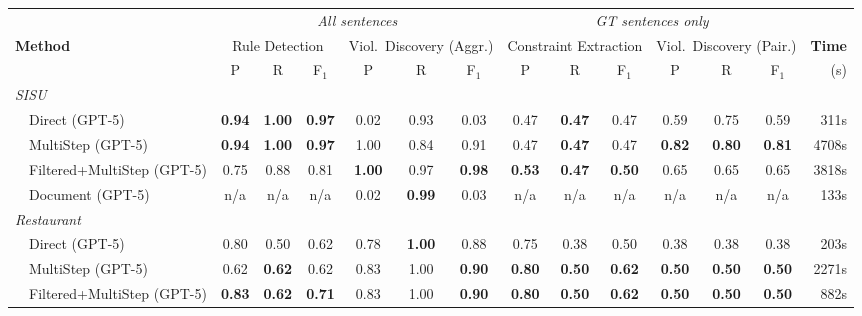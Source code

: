\begin{table}[t]
  \centering
  \small
  \setlength{\tabcolsep}{4pt}
  \begin{tabular}{lcccccc@{\hspace{1.2em}}cccccc@{\hspace{1.0em}}r}
    \toprule
    & \multicolumn{6}{c}{\textit{All sentences}} & \multicolumn{6}{c}{\textit{GT sentences only}} & \\
    \cmidrule(lr){2-7}\cmidrule(lr){8-13}
    \textbf{Method} & \multicolumn{3}{c}{Rule Detection} & \multicolumn{3}{c}{Viol.\ Discovery (Aggr.)} & \multicolumn{3}{c}{Constraint Extraction} & \multicolumn{3}{c}{Viol.\ Discovery (Pair.)} & \textbf{Time} \\
    \cmidrule(lr){2-4}  \cmidrule(lr){5-7}  \cmidrule(lr){8-10}  \cmidrule(lr){11-13}
    & P & R & F$_1$ & P & R & F$_1$ & P & R & F$_1$ & P & R & F$_1$ & (s) \\
    \midrule
    \multicolumn{14}{l}{\textit{SISU}} \\
    ~~Direct (GPT-5) & \textbf{0.94} & \textbf{1.00} & \textbf{0.97} & 0.02 & 0.93 & 0.03 & 0.47 & \textbf{0.47} & 0.47 & 0.59 & 0.75 & 0.59 & 311s \\
    ~~MultiStep (GPT-5) & \textbf{0.94} & \textbf{1.00} & \textbf{0.97} & 1.00 & 0.84 & 0.91 & 0.47 & \textbf{0.47} & 0.47 & \textbf{0.82} & \textbf{0.80} & \textbf{0.81} & 4708s \\
    ~~Filtered+MultiStep (GPT-5) & 0.75 & 0.88 & 0.81 & \textbf{1.00} & 0.97 & \textbf{0.98} & \textbf{0.53} & \textbf{0.47} & \textbf{0.50} & 0.65 & 0.65 & 0.65 & 3818s \\
    ~~Document (GPT-5) & n/a & n/a & n/a & 0.02 & \textbf{0.99} & 0.03 & n/a & n/a & n/a & n/a & n/a & n/a & 133s \\
    \midrule
    \multicolumn{14}{l}{\textit{Restaurant}} \\
    ~~Direct (GPT-5) & 0.80 & 0.50 & 0.62 & 0.78 & \textbf{1.00} & 0.88 & 0.75 & 0.38 & 0.50 & 0.38 & 0.38 & 0.38 & 203s \\
    ~~MultiStep (GPT-5) & 0.62 & \textbf{0.62} & 0.62 & 0.83 & 1.00 & \textbf{0.90} & \textbf{0.80} & \textbf{0.50} & \textbf{0.62} & \textbf{0.50} & \textbf{0.50} & \textbf{0.50} & 2271s \\
    ~~Filtered+MultiStep (GPT-5) & \textbf{0.83} & \textbf{0.62} & \textbf{0.71} & 0.83 & 1.00 & \textbf{0.90} & \textbf{0.80} & \textbf{0.50} & \textbf{0.62} & \textbf{0.50} & \textbf{0.50} & \textbf{0.50} & 882s \\

\end{tabular}
\end{table}
